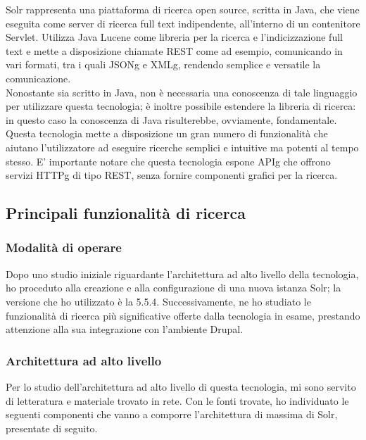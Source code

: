		\gls{Solr} rappresenta una piattaforma di ricerca \gls{open source}, scritta in \gls{Java}, che viene eseguita come server di ricerca full text indipendente, all'interno di un contenitore \gls{Servlet}. Utilizza \gls{Java Lucene} come libreria per la ricerca e l'indicizzazione full text e mette a disposizione chiamate \gls{REST} come ad esempio, comunicando in vari formati, tra i quali \gls{JSONg} e \gls{XMLg}, rendendo semplice e versatile la comunicazione. \\ Nonostante sia scritto in \gls{Java}, non è necessaria una conoscenza di tale linguaggio per utilizzare questa tecnologia; è inoltre possibile estendere la libreria di ricerca: in questo caso la conoscenza di \gls{Java} risulterebbe, ovviamente, fondamentale. \\
		Questa tecnologia mette a disposizione un gran numero di funzionalità che aiutano l'utilizzatore ad eseguire ricerche semplici e intuitive ma potenti al tempo stesso. E' importante notare che questa tecnologia espone \gls{APIg} che offrono servizi \gls{HTTPg} di tipo \gls{REST}, senza fornire componenti grafici per la ricerca.
		
		\subsection{Principali funzionalità di ricerca}
		
			\subsubsection{Modalità di operare}
			Dopo uno studio iniziale riguardante l'architettura ad alto livello della tecnologia, ho proceduto alla creazione e alla configurazione di una nuova istanza \gls{Solr}; la versione che ho utilizzato è la 5.5.4. Successivamente, ne ho studiato le funzionalità di ricerca più significative offerte dalla tecnologia in esame, prestando attenzione alla sua integrazione con l'ambiente \gls{Drupal}.
			
			\subsubsection{Architettura ad alto livello}
			\label{solr:architettura_ad_alto_livello}
			Per lo studio dell'architettura ad alto livello di questa tecnologia, mi sono servito di letteratura e materiale trovato in rete. Con le fonti trovate, ho individuato le seguenti componenti che vanno a comporre l'architettura di massima di \gls{Solr}, presentate di seguito.
			
